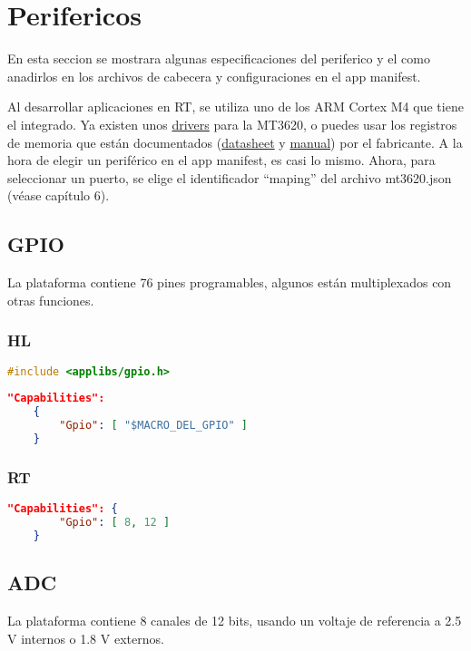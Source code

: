 \section{Perifericos}
En esta seccion se mostrara algunas especificaciones del periferico y el como anadirlos en los archivos de cabecera y configuraciones en el app manifest.\par
Al desarrollar aplicaciones en RT, se utiliza uno de los ARM Cortex M4 que tiene el integrado. Ya existen unos \href{https://github.com/CodethinkLabs/mt3620-m4-drivers/tree/master}{drivers} para la MT3620, o puedes usar los registros de memoria que están documentados (\href{https://d86o2zu8ugzlg.cloudfront.net/mediatek-craft/documents/mt3620/MT3620-Datasheet-v1.7.pdf}{datasheet} y
\href{https://d86o2zu8ugzlg.cloudfront.net/mediatek-craft/documents/MT3620-M4-User-Manual.pdf}{manual}) por el fabricante. A la hora de elegir un periférico en el app manifest, es casi lo mismo. Ahora, para seleccionar un puerto, se elige el identificador ``maping'' del archivo mt3620.json (véase capítulo 6).


\subsection{GPIO}
La plataforma contiene 76 pines programables, algunos están multiplexados con otras funciones.
\subsubsection{HL}

\begin{lstlisting}[language = C, firstnumber=0]
	#include <applibs/gpio.h>
\end{lstlisting}
\begin{lstlisting}[language = json, firstnumber=0]	
	"Capabilities": 
	{  
		"Gpio": [ "$MACRO_DEL_GPIO" ] 
	}
\end{lstlisting}
\subsubsection{RT}
\begin{lstlisting}[language = json, firstnumber=0]	
	"Capabilities": {
		"Gpio": [ 8, 12 ]
	}
\end{lstlisting}

\subsection{ADC}
La plataforma contiene 8 canales de 12 bits, usando un voltaje de referencia a 2.5 V internos o 1.8 V externos.

